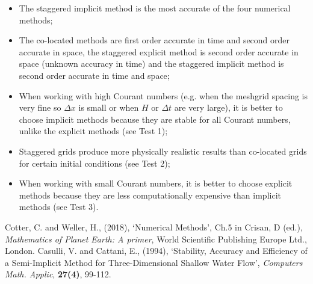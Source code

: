 \documentclass[a4paper, 10pt, notitlepage]{article}
\begin{document}
\begin{itemize}
	\item The staggered implicit method is the most accurate of the four numerical methods;
	\item The co-located methods are first order accurate in time and second order accurate in space, the staggered explicit method is second order accurate in space (unknown accuracy in time) and the staggered implicit method is second order accurate in time and space;
	\item When working with high Courant numbers (e.g. when the meshgrid spacing is very fine so $\Delta x$ is small or when $H$ or $\Delta t$ are very large), it is better to choose implicit methods because they are stable for all Courant numbers, unlike the explicit methods (see Test 1);
	\item Staggered grids produce more physically realistic results than co-located grids for certain initial conditions (see Test 2);
	\item When working with small Courant numbers, it is better to choose explicit methods because they are less computationally expensive than implicit methods (see Test 3).
\end{itemize}


\begin{thebibliography}{9}
	Cotter, C. and Weller, H., (2018), \textquoteleft Numerical Methods\textquoteright, Ch.5 in Crisan, D (ed.), \textit{Mathematics of Planet Earth: A primer}, World Scientific Publishing Europe Ltd., London.
	Casulli, V. and Cattani, E., (1994), \textquoteleft Stability, Accuracy and Efficiency of a Semi-Implicit Method for Three-Dimensional Shallow Water Flow\textquoteright, \textit{Computers Math. Applic}, \textbf{27(4)}, 99-112.
\end{thebibliography}
\end{document}
